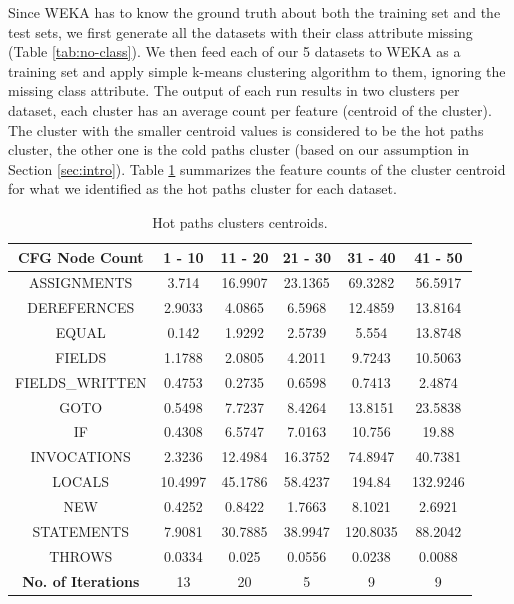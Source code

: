 \documentclass[10pt,twocolumn,letterpaper]{article}
\begin{document}
Since WEKA \cite{hall2009weka} has to know the ground truth about both the training set and the test sets, we first generate all the datasets with their class
attribute missing (Table \ref{tab:no-class}). We then feed each of our 5 datasets to WEKA as a training set and apply simple k-means clustering algorithm to
them, ignoring the missing class attribute. The output of each run results in two clusters per dataset, each cluster has an average count per feature (centroid
of the cluster). The cluster with the smaller centroid values is considered to be the hot paths cluster, the other one is the cold paths cluster (based on our
assumption in Section \ref{sec:intro}). Table \ref{tab:avg} summarizes the feature counts of the cluster centroid for what we identified as the hot paths
cluster for each dataset.

\begin{table}[t!]
\centering
\begin{tabular}{|c|c|c|c|c|c|}
\hline
\textbf{CFG Node Count} & \textbf{1 - 10} & \textbf{11 - 20} & \textbf{21 - 30} & \textbf{31 - 40} & \textbf{41 - 50} \\
\hline\hline
ASSIGNMENTS & 3.714 & 16.9907 & 23.1365 & 69.3282 & 56.5917 \\
\hline
DEREFERNCES & 2.9033 & 4.0865 & 6.5968 & 12.4859 & 13.8164 \\
\hline
EQUAL & 0.142 & 1.9292 & 2.5739 & 5.554 & 13.8748 \\
\hline
FIELDS & 1.1788 & 2.0805 & 4.2011 & 9.7243 & 10.5063 \\
\hline
FIELDS\_WRITTEN & 0.4753 & 0.2735 & 0.6598 & 0.7413 & 2.4874 \\
\hline
GOTO & 0.5498 & 7.7237 & 8.4264 & 13.8151 & 23.5838 \\
\hline
IF & 0.4308 & 6.5747 & 7.0163 & 10.756 & 19.88 \\
\hline
INVOCATIONS & 2.3236 & 12.4984 & 16.3752 & 74.8947 & 40.7381 \\
\hline
LOCALS & 10.4997 & 45.1786 & 58.4237 & 194.84 & 132.9246 \\
\hline
NEW & 0.4252 & 0.8422 & 1.7663 & 8.1021 & 2.6921 \\
\hline
STATEMENTS & 7.9081 & 30.7885 & 38.9947 & 120.8035 & 88.2042 \\
\hline
THROWS & 0.0334 & 0.025 & 0.0556 & 0.0238 & 0.0088 \\
\hline\hline
\textbf{No. of Iterations}  & 13 & 20 & 5 & 9 & 9 \\
\hline
\end{tabular}
\centering
\caption{Hot paths clusters centroids.}
\label{tab:avg}
\end{table}
\end{document}
